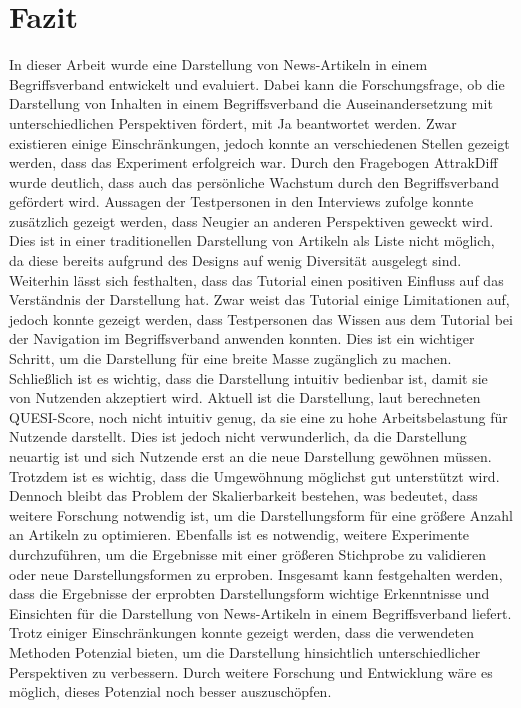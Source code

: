 \section{Fazit}\label{sec:conclusion}
In dieser Arbeit wurde eine Darstellung von News-Artikeln in einem Begriffsverband entwickelt und evaluiert.
Dabei kann die Forschungsfrage, ob die Darstellung von Inhalten in einem Begriffsverband die Auseinandersetzung mit unterschiedlichen Perspektiven fördert, mit Ja beantwortet werden.
Zwar existieren einige Einschränkungen, jedoch konnte an verschiedenen Stellen gezeigt werden, dass das Experiment erfolgreich war.
Durch den Fragebogen AttrakDiff wurde deutlich, dass auch das persönliche Wachstum durch den Begriffsverband gefördert wird.
Aussagen der Testpersonen in den Interviews zufolge konnte zusätzlich gezeigt werden, dass Neugier an anderen Perspektiven geweckt wird.
Dies ist in einer traditionellen Darstellung von Artikeln als Liste nicht möglich, da diese bereits aufgrund des Designs auf wenig Diversität ausgelegt sind.\\

Weiterhin lässt sich festhalten, dass das Tutorial einen positiven Einfluss auf das Verständnis der Darstellung hat.
Zwar weist das Tutorial einige Limitationen auf, jedoch konnte gezeigt werden, dass Testpersonen das Wissen aus dem Tutorial bei der Navigation im Begriffsverband anwenden konnten.
Dies ist ein wichtiger Schritt, um die Darstellung für eine breite Masse zugänglich zu machen.
Schließlich ist es wichtig, dass die Darstellung intuitiv bedienbar ist, damit sie von Nutzenden akzeptiert wird.
Aktuell ist die Darstellung, laut berechneten \ac{QUESI}-Score, noch nicht intuitiv genug, da sie eine zu hohe Arbeitsbelastung für Nutzende darstellt.
Dies ist jedoch nicht verwunderlich, da die Darstellung neuartig ist und sich Nutzende erst an die neue Darstellung gewöhnen müssen.
Trotzdem ist es wichtig, dass die Umgewöhnung möglichst gut unterstützt wird. \\

Dennoch bleibt das Problem der Skalierbarkeit bestehen, was bedeutet, dass weitere Forschung notwendig ist, um die Darstellungsform für eine größere Anzahl an Artikeln zu optimieren.
Ebenfalls ist es notwendig, weitere Experimente durchzuführen, um die Ergebnisse mit einer größeren Stichprobe zu validieren oder neue Darstellungsformen zu erproben.
Insgesamt kann festgehalten werden, dass die Ergebnisse der erprobten Darstellungsform wichtige Erkenntnisse und Einsichten für die Darstellung von News-Artikeln in einem Begriffsverband liefert.
Trotz einiger Einschränkungen konnte gezeigt werden, dass die verwendeten Methoden Potenzial bieten, um die Darstellung hinsichtlich unterschiedlicher Perspektiven zu verbessern.
Durch weitere Forschung und Entwicklung wäre es möglich, dieses Potenzial noch besser auszuschöpfen.

